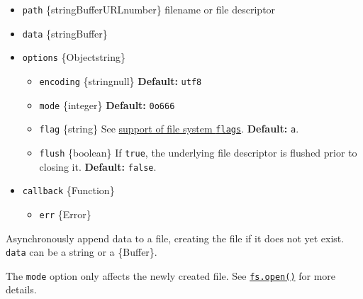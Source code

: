 \begin{itemize}
\tightlist
\item
  \texttt{path} \{string\textbar Buffer\textbar URL\textbar number\}
  filename or file descriptor
\item
  \texttt{data} \{string\textbar Buffer\}
\item
  \texttt{options} \{Object\textbar string\}

  \begin{itemize}
  \tightlist
  \item
    \texttt{encoding} \{string\textbar null\} \textbf{Default:}
    \texttt{\textquotesingle{}utf8\textquotesingle{}}
  \item
    \texttt{mode} \{integer\} \textbf{Default:} \texttt{0o666}
  \item
    \texttt{flag} \{string\} See \hyperref[file-system-flags]{support of
    file system \texttt{flags}}. \textbf{Default:}
    \texttt{\textquotesingle{}a\textquotesingle{}}.
  \item
    \texttt{flush} \{boolean\} If \texttt{true}, the underlying file
    descriptor is flushed prior to closing it. \textbf{Default:}
    \texttt{false}.
  \end{itemize}
\item
  \texttt{callback} \{Function\}

  \begin{itemize}
  \tightlist
  \item
    \texttt{err} \{Error\}
  \end{itemize}
\end{itemize}

Asynchronously append data to a file, creating the file if it does not
yet exist. \texttt{data} can be a string or a \{Buffer\}.

The \texttt{mode} option only affects the newly created file. See
\hyperref[fsopenpath-flags-mode-callback]{\texttt{fs.open()}} for more
details.

\begin{Shaded}
\begin{Highlighting}[]
 \OperatorTok{;}

\NormalTok{(}\OperatorTok{,} \OperatorTok{,}\KeywordTok{=\textgreater{}}\NormalTok{ \{}
  \OperatorTok{;}
  \NormalTok{(}\NormalTok{)}\OperatorTok{;}
\NormalTok{\})}\OperatorTok{;}
\end{Highlighting}
\end{Shaded}

